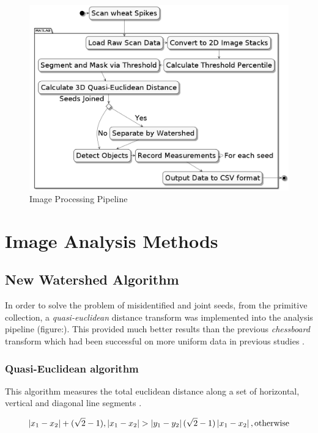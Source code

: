 \documentclass[11pt]{report}
\begin{document}
\begin{figure}[htbp]
\centering
\includegraphics[width=13cm]{./images/matlab.png}
\caption{\label{fig:orga3d712c}
Image Processing Pipeline}
\end{figure}

\section{Image Analysis Methods}
\label{sec:org1e57682}
\subsection{New Watershed Algorithm}
\label{sec:org203c819}

In order to solve the problem of misidentified and joint seeds, from the primitive collection,
a  \emph{quasi-euclidean} distance transform was implemented into the analysis pipeline (figure:). This provided much better results than the previous
\emph{chessboard} transform which had been successful on more uniform data in previous studies \cite{Hughes2017}.

\subsubsection{Quasi-Euclidean algorithm}
\label{sec:org8a915c2}

This algorithm measures the total euclidean distance along a set of horizontal, vertical and diagonal
line segments \cite{Pfaltz1966}.

\begin{equation}
\label{eq:org2f5c963}
\left | x_1 - x_2 \right | + (\sqrt{2}-1), \left | x_1 - x_2 \right | >\left | y_1 - y_2 \right | (\sqrt{2}-1) \left | x_1 - x_2 \right | ,\textup{otherwise}
\end{equation}
\end{document}
